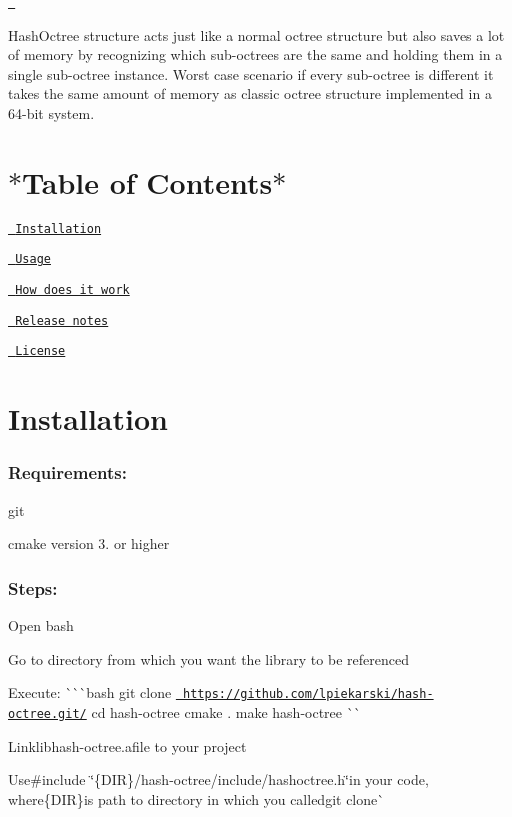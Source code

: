 \href{https://travis-ci.com/lpiekarski/hash-octree}{\texttt{ }}

Hash\+Octree structure acts just like a normal octree structure but also saves a lot of memory by recognizing which sub-\/octrees are the same and holding them in a single sub-\/octree instance. Worst case scenario if every sub-\/octree is different it takes the same amount of memory as classic octree structure implemented in a 64-\/bit system.

\section*{$\ast$\+Table of Contents$\ast$}


\begin{DoxyItemize}
\item \href{\#installation}{\texttt{ Installation}}
\item \href{\#usage}{\texttt{ Usage}}
\item \href{\#how-does-it-work}{\texttt{ How does it work}}
\item \href{\#release-notes}{\texttt{ Release notes}}
\item \href{\#license}{\texttt{ License}}
\end{DoxyItemize}

\section*{Installation}

\subsubsection*{Requirements\+:}


\begin{DoxyItemize}
\item {\ttfamily git}
\item {\ttfamily cmake} version 3. or higher \subsubsection*{Steps\+:}
\end{DoxyItemize}


\begin{DoxyEnumerate}
\item Open bash
\item Go to directory from which you want the library to be referenced
\item Execute\+: \`{}\`{}\`{}bash git clone \href{https://github.com/lpiekarski/hash-octree.git/}{\texttt{ https\+://github.\+com/lpiekarski/hash-\/octree.\+git/}} cd hash-\/octree cmake . make hash-\/octree \`{}\`{}{\ttfamily }
\item {\ttfamily Link}libhash-\/octree.\+a{\ttfamily file to your project}
\item {\ttfamily Use}\#include \char`\"{}\{\+D\+I\+R\}/hash-\/octree/include/hashoctree.\+h\char`\"{}{\ttfamily in your code, where}\{D\+IR\}{\ttfamily is path to directory in which you called}git clone\`{}
\end{DoxyEnumerate}

